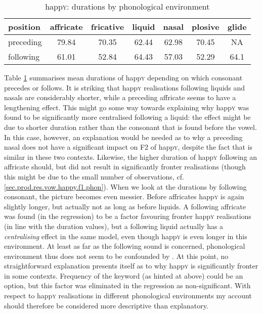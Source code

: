 \begin{table}[h!]
	\centering
	\caption{happ\textsc{y}: durations by phonological environment}
	\label{tab.dur.phon.happy}
	\begin{tabular}{lcccccc}
		\hline
		position & affricate & fricative & liquid & nasal & plosive & glide\\
		\hline
		preceding & 79.84 & 70.35 & 62.44 & 62.98 & 70.45 & NA\\
		following & 61.01 & 52.84 & 64.43 & 57.03 & 52.29 & 64.1\\
		\hline
	\end{tabular}
\end{table}

Table \ref{tab.dur.phon.happy} summarises mean durations of happ\textsc{y} depending on which consonant precedes or follows.
It is striking that happ\textsc{y} realisations following liquids and nasals are considerably shorter, while a preceding affricate seems to have a lengthening effect.
This might go some way towards explaining why happ\textsc{y} was found to be significantly more centralised following a liquid: the effect might be due to shorter duration rather than the consonant that is found before the vowel.
In this case, however, an explanation would be needed as to why a preceding nasal does not have a significant impact on F2 of happ\textsc{y}, despite the fact that  is similar in these two contexts.
Likewise, the higher duration of happ\textsc{y} following an affricate should, but did not result in significantly fronter realisations (though this might be due to the small number of observations, cf. \ref{sec.prod.res.vow.happy.f1.phon}).
When we look at the durations by following consonant, the picture becomes even messier.
Before affricates happ\textsc{y} is again slightly longer, but actually not as long as before liquids.
A following affricate was found (in the regression) to be a factor favouring fronter happ\textsc{y} realisations (in line with the duration values), but a following liquid actually has a \emph{centralising} effect in the same model, even though happ\textsc{y} is even longer in this environment.
At least as far as the following sound is concerned, phonological environment thus does not seem to be confounded by .
At this point, no straightforward explanation presents itself as to why happ\textsc{y} is significantly fronter in some contexts.
Frequency of the keyword (as hinted at above) could be an option, but this factor was eliminated in the regression as non-significant.
With respect to happ\textsc{y} realisations in different phonological environments my account should therefore be considered more descriptive than explanatory.

